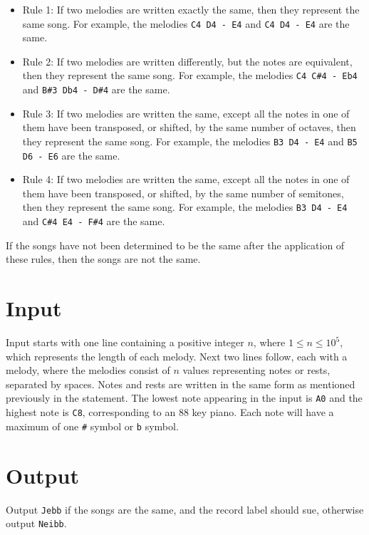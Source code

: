 \begin{itemize}
    \item Rule 1: If two melodies are written exactly the same, then they represent the same song.
    For example, the melodies \texttt{C4 D4 - E4} and \texttt{C4 D4 - E4} are the same.
    \item Rule 2: If two melodies are written differently, but the notes are equivalent, then they represent the same song.
    For example, the melodies \texttt{C4 C\#4 - Eb4} and \texttt{B\#3 Db4 - D\#4} are the same.
    \item Rule 3: If two melodies are written the same, except all the notes in one of them have been transposed, or shifted, by the same number of octaves, then they represent the same song.
    For example, the melodies \texttt{B3 D4 - E4} and \texttt{B5 D6 - E6} are the same.
    \item Rule 4: If two melodies are written the same, except all the notes in one of them have been transposed, or shifted, by the same number of semitones, then they represent the same song.
    For example, the melodies \texttt{B3 D4 - E4} and \texttt{C\#4 E4 - F\#4} are the same.
\end{itemize}

If the songs have not been determined to be the same after the application of these rules, then the songs are not the same.

\section*{Input}
Input starts with one line containing a positive integer $n$, where $1 \leq n \leq 10^5$, which represents the length of each melody.
Next two lines follow, each with a melody, where the melodies consist of $n$ values representing notes or rests, separated by spaces.
Notes and rests are written in the same form as mentioned previously in the statement.
The lowest note appearing in the input is \texttt{A0} and the highest note is \texttt{C8}, corresponding to an $88$ key piano.
Each note will have a maximum of one \texttt{\#} symbol or \texttt{b} symbol.


\section*{Output}
Output \texttt{Jebb} if the songs are the same, and the record label should sue, otherwise output \texttt{Neibb}.

